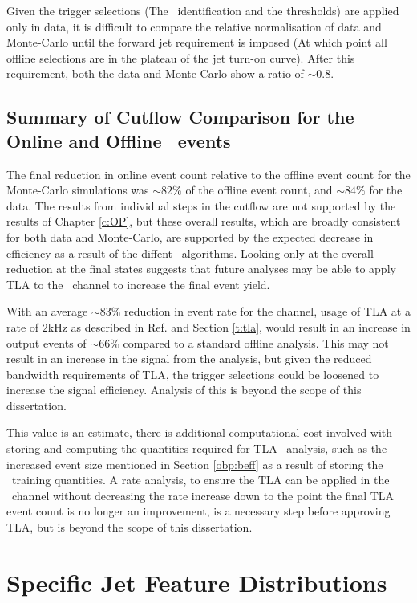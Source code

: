     Given the trigger selections (The \bjet\ identification and the \pt thresholds) are applied only in data, it is difficult to compare the relative normalisation of data and Monte-Carlo until the forward jet requirement is imposed (At which point all offline selections are in the plateau of the jet turn-on curve). After this requirement, both the data and Monte-Carlo show a ratio of $\sim0.8$.

    \subsection{Summary of Cutflow Comparison for the Online and Offline \VBFHBB\ events}

    The final reduction in online event count relative to the offline event count for the Monte-Carlo simulations was $\sim82\%$ of the offline event count, and $\sim84\%$  for the data. The results from individual steps in the cutflow are not supported by the results of Chapter \ref{c:OP}, but these overall results, which are broadly consistent for both data and Monte-Carlo, are supported by the expected decrease in efficiency as a result of the diffent \btag\ algorithms. Looking only at the overall reduction at the final states suggests that future analyses may be able to apply TLA to the \VBFHBB\ channel to increase the final event yield.

    With an average $\sim83\%$ reduction in event rate for the channel, usage of TLA at a rate of $2$kHz as described in Ref. \cite{tla} and Section \ref{t:tla}, would result in an increase in output events of $\sim66\%$ compared to a standard offline analysis. This may not result in an increase in the signal from the analysis, but given the reduced bandwidth requirements of TLA, the trigger selections could be loosened to increase the signal efficiency. Analysis of this is beyond the scope of this dissertation.

    This value is an estimate, there is additional computational cost involved with storing and computing the quantities required for TLA \VBFHBB\ analysis, such as the increased event size mentioned in Section \ref{obp:beff} as a result of storing the \btag\ training quantities. A rate analysis, to ensure the TLA can be applied in the \VBFHBB\ channel without decreasing the rate increase down to the point the final TLA event count is no longer an improvement, is a necessary step before approving TLA, but is beyond the scope of this dissertation.

\newpage
\section{Specific Jet Feature Distributions}
\label{k:jets}

